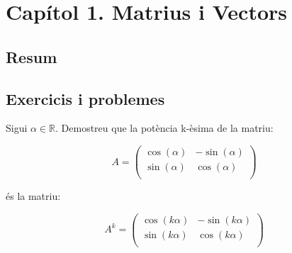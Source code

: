 \chapter{Capítol 1. Matrius i Vectors} \label{cap:matrius}

\section{Resum}

\section{Exercicis i problemes} \label{sec:matrius-exercicis}
\begin{exercise}[1.8.1]\label{ex:1.8.1}

Sigui $\alpha \in \mathbb{R}$. Demostreu que la potència k-èsima de la matriu:

\begin{equation}
\label{e181_A}
A = \begin{pmatrix}
    \cos(\alpha) & -\sin(\alpha)\\
    \sin(\alpha) & \cos(\alpha)\\
\end{pmatrix}
\end{equation}

és la matriu:


\begin{equation} 
\label{e181_Ak}
A^k = \begin{pmatrix}
    \cos(k\alpha) & -\sin(k\alpha)\\
    \sin(k\alpha) & \cos(k\alpha)\\
\end{pmatrix}
\end{equation}
\end{exercise}


